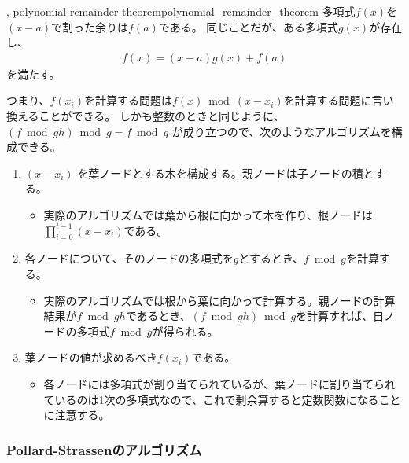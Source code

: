 \begin{Theo}{, polynomial remainder theorem}{polynomial_remainder_theorem}
多項式$f(x)$を$(x-a)$で割った余りは$f(a)$である。
同じことだが、ある多項式$g(x)$が存在し、
\begin{align*}
f(x) = (x-a)g(x) + f(a)
\end{align*}
を満たす。
\end{Theo}

つまり、$f(x_i)$を計算する問題は$f(x) \bmod{(x-x_i)}$を計算する問題に言い換えることができる。
しかも整数のときと同じように、$(f \bmod{gh}) \bmod{g} = f \bmod{g}$ が成り立つので、次のようなアルゴリズムを構成できる。

\begin{enumerate}
 \item $(x-x_i)$ を葉ノードとする木を構成する。親ノードは子ノードの積とする。
 \begin{itemize}
  \item 実際のアルゴリズムでは葉から根に向かって木を作り、根ノードは$\prod_{i=0}^{t-1}(x-x_i)$である。
 \end{itemize}
 \item 各ノードについて、そのノードの多項式を$g$とするとき、$f \bmod{g}$を計算する。
 \begin{itemize}
  \item 実際のアルゴリズムでは根から葉に向かって計算する。親ノードの計算結果が$f \bmod{gh}$であるとき、$(f \bmod{gh}) \bmod{g}$を計算すれば、自ノードの多項式$f \bmod{g}$が得られる。
 \end{itemize}
 \item 葉ノードの値が求めるべき$f(x_i)$である。
 \begin{itemize}
  \item 各ノードには多項式が割り当てられているが、葉ノードに割り当てられているのは1次の多項式なので、これで剰余算すると定数関数になることに注意する。
 \end{itemize}
\end{enumerate}


\subsubsection{Pollard-Strassenのアルゴリズム}
\cite{pollard_1974, Strassen1976/77}


